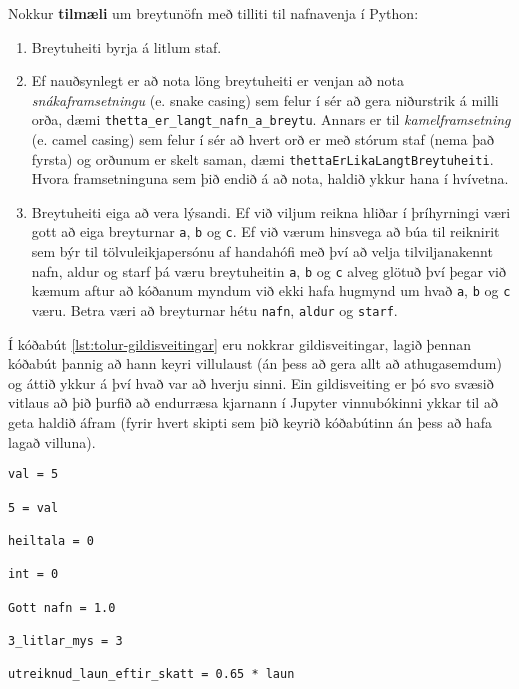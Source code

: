 Nokkur \textbf{tilmæli} um breytunöfn með tilliti til nafnavenja í Python:
\vspace{0.1cm}
\begin{enumerate}
	\item Breytuheiti byrja á litlum staf.
	\item Ef nauðsynlegt er að nota löng breytuheiti er venjan að nota \textit{snákaframsetningu} (e. snake casing) sem felur í sér að gera niðurstrik á milli orða, dæmi \texttt{thetta\_er\_langt\_nafn\_a\_breytu}.
	Annars er til \textit{kamelframsetning} (e. camel casing) sem felur í sér að hvert orð er með stórum staf (nema það fyrsta) og orðunum er skelt saman, dæmi \texttt{thettaErLikaLangtBreytuheiti}.
	Hvora framsetninguna sem þið endið á að nota, haldið ykkur hana í hvívetna.
	\item Breytuheiti eiga að vera lýsandi.
	Ef við viljum reikna hliðar í þríhyrningi væri gott að eiga breyturnar \texttt{a}, \texttt{b} og \texttt{c}.
	Ef við værum hinsvega að búa til reiknirit sem býr til tölvuleikjapersónu af handahófi með því að velja tilviljanakennt nafn, aldur og starf þá væru breytuheitin \texttt{a}, \texttt{b} og \texttt{c} alveg glötuð því þegar við kæmum aftur að kóðanum myndum við ekki hafa hugmynd um hvað \texttt{a}, \texttt{b} og \texttt{c} væru. 
	Betra væri að breyturnar hétu \texttt{nafn}, \texttt{aldur} og \texttt{starf}.
\end{enumerate}
\vspace{0.3cm}

Í kóðabút \ref{lst:tolur-gildisveitingar} eru nokkrar gildisveitingar, lagið þennan kóðabút þannig að hann keyri villulaust (án þess að gera allt að athugasemdum) og áttið ykkur á því hvað var að hverju sinni.
Ein gildisveiting er þó svo svæsið vitlaus að þið þurfið að endurræsa kjarnann í Jupyter vinnubókinni ykkar til að geta haldið áfram (fyrir hvert skipti sem þið keyrið kóðabútinn án þess að hafa lagað villuna).

\begin{lstlisting}[caption=Dæmi um réttar og rangar gildisvetingar, label=lst:tolur-gildisveitingar]
val = 5

5 = val

heiltala = 0

int = 0 

Gott nafn = 1.0

3_litlar_mys = 3

utreiknud_laun_eftir_skatt = 0.65 * laun
\end{lstlisting}

